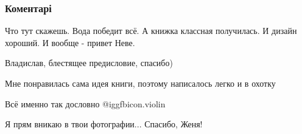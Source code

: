  
 
 
 
 
\subsubsection{Коментарі}

\begin{itemize} %
Что тут скажешь. Вода победит всё.
А книжка классная получилась. И дизайн хороший.
И вообще - привет Неве.

Владислав, блестящее предисловие, спасибо)

Мне понравилась сама идея книги, поэтому написалось легко и в охотку

Всё именно так дословно @igg{fbicon.violin} 

Я прям вникаю в твои фотографии... Спасибо, Женя!
\end{itemize} %
